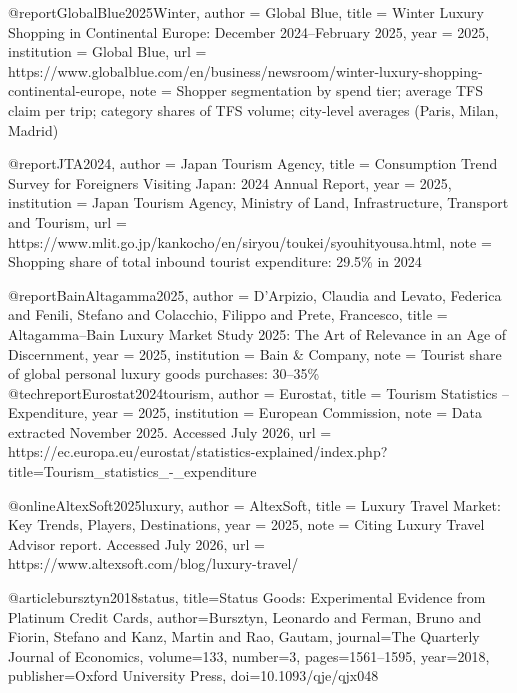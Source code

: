 @report{GlobalBlue2025Winter,
  author       = {{Global Blue}},
  title        = {Winter Luxury Shopping in {Continental Europe}: {December} 2024--{February} 2025},
  year         = {2025},
  institution  = {Global Blue},
  url          = {https://www.globalblue.com/en/business/newsroom/winter-luxury-shopping-continental-europe},
  note         = {Shopper segmentation by spend tier; average TFS claim per trip; category shares of TFS volume; city-level averages (Paris, Milan, Madrid)}
}

@report{JTA2024,
  author       = {{Japan Tourism Agency}},
  title        = {Consumption Trend Survey for Foreigners Visiting {Japan}: 2024 Annual Report},
  year         = {2025},
  institution  = {Japan Tourism Agency, Ministry of Land, Infrastructure, Transport and Tourism},
  url          = {https://www.mlit.go.jp/kankocho/en/siryou/toukei/syouhityousa.html},
  note         = {Shopping share of total inbound tourist expenditure: 29.5\% in 2024}
}

@report{BainAltagamma2025,
  author       = {D'Arpizio, Claudia and Levato, Federica and Fenili, Stefano and Colacchio, Filippo and Prete, Francesco},
  title        = {Altagamma--{Bain} Luxury Market Study 2025: The Art of Relevance in an Age of Discernment},
  year         = {2025},
  institution  = {Bain \& Company},
  note         = {Tourist share of global personal luxury goods purchases: 30--35\%}
}
@techreport{Eurostat2024tourism,
  author       = {{Eurostat}},
  title        = {Tourism Statistics -- Expenditure},
  year         = {2025},
  institution  = {European Commission},
  note         = {Data extracted November 2025. Accessed July 2026},
  url          = {https://ec.europa.eu/eurostat/statistics-explained/index.php?title=Tourism_statistics_-_expenditure}
}

@online{AltexSoft2025luxury,
  author       = {{AltexSoft}},
  title        = {Luxury Travel Market: Key Trends, Players, Destinations},
  year         = {2025},
  note         = {Citing Luxury Travel Advisor report. Accessed July 2026},
  url          = {https://www.altexsoft.com/blog/luxury-travel/}
}

@article{bursztyn2018status,
  title={Status Goods: Experimental Evidence from Platinum Credit Cards},
  author={Bursztyn, Leonardo and Ferman, Bruno and Fiorin, Stefano and Kanz, Martin and Rao, Gautam},
  journal={The Quarterly Journal of Economics},
  volume={133},
  number={3},
  pages={1561--1595},
  year={2018},
  publisher={Oxford University Press},
  doi={10.1093/qje/qjx048}
}

